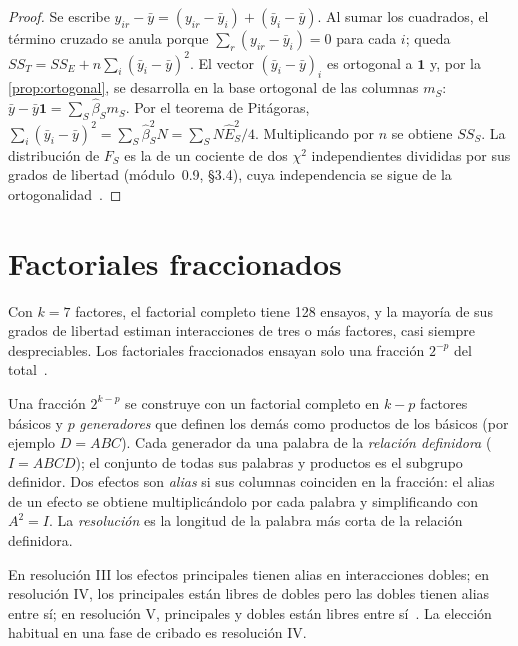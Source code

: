 \begin{proof}
Se escribe $y_{ir}-\bar y=(y_{ir}-\bar y_i)+(\bar y_i-\bar y)$. Al sumar los cuadrados, el término cruzado se anula porque $\sum_r(y_{ir}-\bar y_i)=0$ para cada $i$; queda $SS_T=SS_E+n\sum_i(\bar y_i-\bar y)^2$. El vector $(\bar y_i-\bar y)_i$ es ortogonal a $\mathbf 1$ y, por la \cref{prop:ortogonal}, se desarrolla en la base ortogonal de las columnas $m_S$: $\bar y-\bar y\mathbf 1=\sum_S\hat\beta_S m_S$. Por el teorema de Pitágoras, $\sum_i(\bar y_i-\bar y)^2=\sum_S\hat\beta_S^2N=\sum_S N\hat E_S^2/4$. Multiplicando por $n$ se obtiene $SS_S$. La distribución de $F_S$ es la de un cociente de dos $\chi^2$ independientes divididas por sus grados de libertad (módulo~0.9, §3.4), cuya independencia se sigue de la ortogonalidad~\cite[§6.3]{montgomery}.
\end{proof}

\section{Factoriales fraccionados}

Con $k=7$ factores, el factorial completo tiene 128 ensayos, y la mayoría de sus grados de libertad estiman interacciones de tres o más factores, casi siempre despreciables. Los factoriales fraccionados ensayan solo una fracción $2^{-p}$ del total~\cite[cap.~8]{montgomery}.

\begin{definicion}\label{def:fraccion}
Una fracción $2^{k-p}$ se construye con un factorial completo en $k-p$ factores básicos y $p$ \emph{generadores} que definen los demás como productos de los básicos (por ejemplo $D=ABC$). Cada generador da una palabra de la \emph{relación definidora} ($I=ABCD$); el conjunto de todas sus palabras y productos es el subgrupo definidor. Dos efectos son \emph{alias} si sus columnas coinciden en la fracción: el alias de un efecto se obtiene multiplicándolo por cada palabra y simplificando con $A^2=I$. La \emph{resolución} es la longitud de la palabra más corta de la relación definidora.
\end{definicion}

En resolución III los efectos principales tienen alias en interacciones dobles; en resolución IV, los principales están libres de dobles pero las dobles tienen alias entre sí; en resolución V, principales y dobles están libres entre sí~\cite[§8.6–8.7]{montgomery}. La elección habitual en una fase de cribado es resolución IV.


